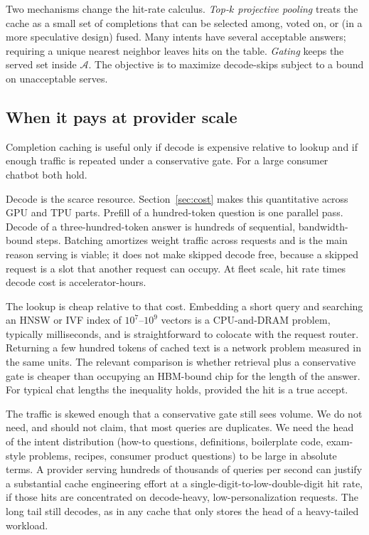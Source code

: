 Two mechanisms change the hit-rate calculus. \emph{Top-$k$ projective pooling} treats the cache as a small set of completions that can be selected among, voted on, or (in a more speculative design) fused. Many intents have several acceptable answers; requiring a unique nearest neighbor leaves hits on the table. \emph{Gating} keeps the served set inside $\mathcal{A}$. The objective is to maximize decode-skips subject to a bound on unacceptable serves.

\subsection{When it pays at provider scale}
\label{sec:intro-why}

Completion caching is useful only if decode is expensive relative to lookup and if enough traffic is repeated under a conservative gate. For a large consumer chatbot both hold.

Decode is the scarce resource. Section~\ref{sec:cost} makes this quantitative across GPU and TPU parts. Prefill of a hundred-token question is one parallel pass. Decode of a three-hundred-token answer is hundreds of sequential, bandwidth-bound steps. Batching amortizes weight traffic across requests and is the main reason serving is viable; it does not make skipped decode free, because a skipped request is a slot that another request can occupy. At fleet scale, hit rate times decode cost is accelerator-hours.

The lookup is cheap relative to that cost. Embedding a short query and searching an HNSW or IVF index of $10^7$--$10^9$ vectors is a CPU-and-DRAM problem, typically milliseconds, and is straightforward to colocate with the request router. Returning a few hundred tokens of cached text is a network problem measured in the same units. The relevant comparison is whether retrieval plus a conservative gate is cheaper than occupying an HBM-bound chip for the length of the answer. For typical chat lengths the inequality holds, provided the hit is a true accept.

The traffic is skewed enough that a conservative gate still sees volume. We do not need, and should not claim, that most queries are duplicates. We need the head of the intent distribution (how-to questions, definitions, boilerplate code, exam-style problems, recipes, consumer product questions) to be large in absolute terms. A provider serving hundreds of thousands of queries per second can justify a substantial cache engineering effort at a single-digit-to-low-double-digit hit rate, if those hits are concentrated on decode-heavy, low-personalization requests. The long tail still decodes, as in any cache that only stores the head of a heavy-tailed workload.

